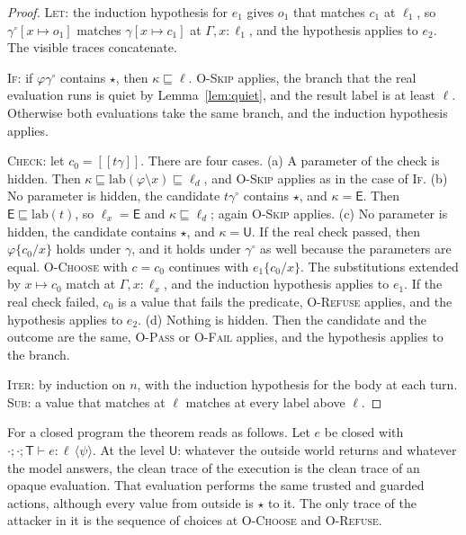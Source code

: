 \documentclass[acmsmall,nonacm,screen]{acmart}
\newcommand{\kw}[1]{\mathsf{#1}}
\newcommand{\T}{\kw{T}}
\newcommand{\E}{\kw{E}}
\newcommand{\U}{\kw{U}}
\newcommand{\lab}{\mathrm{lab}}
\newcommand{\sem}[1]{[\![#1]\!]}
\newcommand{\op}{\star}
\newcommand{\post}[1]{\langle #1 \rangle}
\begin{document}
\begin{proof}
\textsc{Let}: the induction hypothesis for $e_1$ gives $o_1$ that matches $c_1$ at $\ell_1$,
so $\gamma^\circ[x \mapsto o_1]$ matches $\gamma[x \mapsto c_1]$ at $\Gamma, x : \ell_1$, and
the hypothesis applies to $e_2$. The visible traces concatenate.

\textsc{If}: if $\varphi\gamma^\circ$ contains $\op$, then $\kappa \sqsubseteq \ell$.
\textsc{O-Skip} applies, the branch that the real evaluation runs is quiet by
Lemma~\ref{lem:quiet}, and the result label is at least $\ell$. Otherwise both evaluations
take the same branch, and the induction hypothesis applies.

\textsc{Check}: let $c_0 = \sem{t\gamma}$. There are four cases. (a) A parameter of the check
is hidden. Then $\kappa \sqsubseteq \lab(\varphi \setminus x) \sqsubseteq \ell_d$, and
\textsc{O-Skip} applies as in the case of \textsc{If}. (b) No parameter is hidden, the
candidate $t\gamma^\circ$ contains $\op$, and $\kappa = \E$. Then $\E \sqsubseteq \lab(t)$,
so $\ell_x = \E$ and $\kappa \sqsubseteq \ell_d$; again \textsc{O-Skip} applies. (c) No
parameter is hidden, the candidate contains $\op$, and $\kappa = \U$. If the real check
passed, then $\varphi\{c_0/x\}$ holds under $\gamma$, and it holds under $\gamma^\circ$ as
well because the parameters are equal. \textsc{O-Choose} with $c = c_0$ continues with
$e_1\{c_0/x\}$. The substitutions extended by $x \mapsto c_0$ match at
$\Gamma, x : \ell_x$, and the induction hypothesis applies to $e_1$. If the real check
failed, $c_0$ is a value that fails the predicate, \textsc{O-Refuse} applies, and the
hypothesis applies to $e_2$. (d) Nothing is hidden. Then the candidate and the outcome are
the same, \textsc{O-Pass} or \textsc{O-Fail} applies, and the hypothesis applies to the
branch.

\textsc{Iter}: by induction on $n$, with the induction hypothesis for the body at each turn.
\textsc{Sub}: a value that matches at $\ell$ matches at every label above $\ell$.
\end{proof}

For a closed program the theorem reads as follows. Let $e$ be closed with
$\cdot; \cdot; \T \vdash e : \ell\,\post{\psi}$. At the level $\U$: whatever the outside
world returns and whatever the model answers, the clean trace of the execution is the clean
trace of an opaque evaluation. That evaluation performs the same trusted and guarded
actions, although every value from outside is $\op$ to it. The only trace of the attacker in
it is the sequence of choices at \textsc{O-Choose} and \textsc{O-Refuse}.
\end{document}
